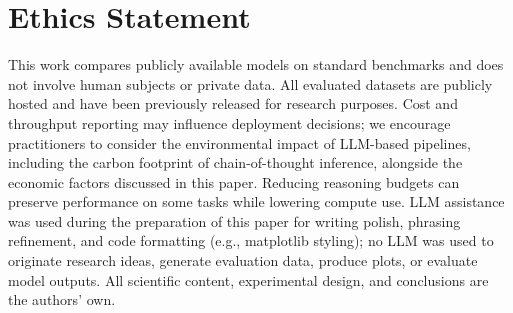 \documentclass{article} %
\begin{document}
\section*{Ethics Statement}

This work compares publicly available models on standard benchmarks and does not involve human subjects or private data.
All evaluated datasets are publicly hosted and have been previously released for research purposes.
Cost and throughput reporting may influence deployment decisions; we encourage practitioners to consider the environmental impact of LLM-based pipelines, including the carbon footprint of chain-of-thought inference, alongside the economic factors discussed in this paper.
Reducing reasoning budgets can preserve performance on some tasks while lowering compute use.
LLM assistance was used during the preparation of this paper for writing polish, phrasing refinement, and code formatting (e.g., matplotlib styling); no LLM was used to originate research ideas, generate evaluation data, produce plots, or evaluate model outputs. All scientific content, experimental design, and conclusions are the authors' own.






\appendix


\end{document}
